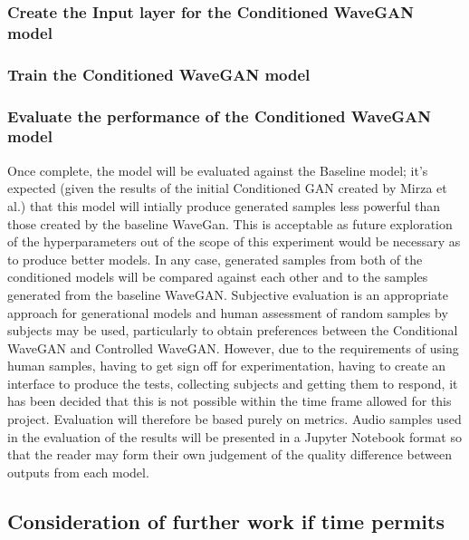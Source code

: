 \documentclass[a4paper, titlepage]{article}
\begin{document}
\subsubsection{Create the Input layer for the Conditioned WaveGAN model}

\subsubsection{Train the Conditioned WaveGAN model}

\subsubsection{Evaluate the performance of the Conditioned WaveGAN model}

Once complete, the model will be evaluated against the Baseline model; it's expected (given the results of the initial Conditioned GAN created by Mirza et al.) that this model will intially produce generated samples less powerful than those created by the baseline WaveGan.
This is acceptable as future exploration of the hyperparameters out of the scope of this experiment would be necessary as to produce better models.
\newline
\newline
In any case, generated samples from both of the conditioned models will be compared against each other and to the samples generated from the baseline WaveGAN.
\newline
\newline
Subjective evaluation is an appropriate approach for generational models and human assessment of random samples by subjects may be used, particularly to obtain preferences between the Conditional WaveGAN and Controlled WaveGAN.
However, due to the requirements of using human samples, having to get sign off for experimentation, having to create an interface to produce the tests, collecting subjects and getting them to respond, it has been decided that this is not possible within the time frame allowed for this project.
Evaluation will therefore be based purely on metrics.
\newline
\newline
Audio samples used in the evaluation of the results will be presented in a Jupyter Notebook format so that the reader may form their own judgement of the quality difference between outputs from each model.

\subsection{Consideration of further work if time permits}
\end{document}

